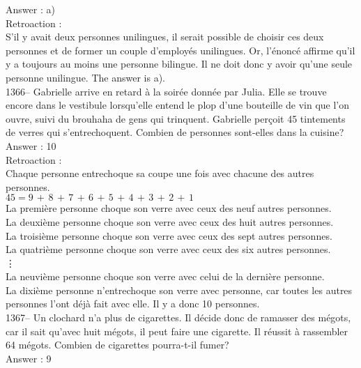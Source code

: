 ﻿\documentclass[letterpaper, 12pt]{article}
\begin{document}
Answer : a)\\

Retroaction : \\
S'il y avait deux personnes unilingues, il serait possible de choisir ces
deux personnes et de former un couple d'employ\'es unilingues.  Or,
l'\'enonc\'e affirme qu'il y a toujours au moins une personne bilingue.  Il
ne doit donc y avoir qu'une seule personne unilingue.  The answer is
a).\\

1366-- Gabrielle arrive en retard \`a la soir\'ee donn\'ee par Julia.  Elle
se trouve encore dans le vestibule lorsqu'elle entend le plop d'une
bouteille de vin que l'on ouvre, suivi du brouhaha de gens qui trinquent.
Gabrielle per\c coit 45 tintements de verres qui s'entrechoquent.  Combien
de personnes sont-elles dans la cuisine?\\

Answer : 10\\

Retroaction :\\
Chaque personne entrechoque sa coupe une fois avec chacune des autres
personnes.  \\
$45=9\,+\,8\,+\,7\,+\,6\,+\,5\,+\,4\,+\,3\,+\,2\,+\,1$\\
La premi\`ere personne choque son verre avec ceux des neuf autres
personnes.\\
La deuxi\`eme personne choque son verre avec ceux des huit autres
personnes.\\
La troisi\`eme personne choque son verre avec ceux des sept autres
personnes.\\
La quatri\`eme personne choque son verre avec ceux des six autres
personnes.\\
\vdots\\
La neuvi\`eme personne choque son verre avec celui de la derni\`ere
personne.\\
La dixi\`eme personne n'entrechoque son verre avec personne, car toutes les
autres personnes l'ont d\'ej\`a fait avec elle.  Il y a donc 10 personnes.\\

1367-- Un clochard n'a plus de cigarettes.  Il d\'ecide donc de ramasser des
m\'egots, car il sait qu'avec huit m\'egots, il peut faire une cigarette.
Il r\'eussit \`a rassembler 64 m\'egots.  Combien de cigarettes pourra-t-il
fumer?\\

Answer : 9\\
\end{document}
